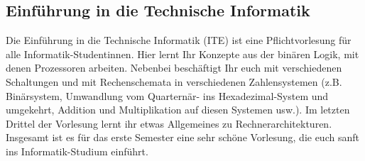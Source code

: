 \subsection{Einführung in die Technische Informatik}
\label{info2}
Die Einführung in die Technische Informatik (\gls{ITE}) ist eine Pflichtvorlesung für alle Informatik-Studentinnen. Hier lernt Ihr Konzepte aus der binären Logik, mit denen Prozessoren arbeiten. Nebenbei beschäftigt Ihr euch mit verschiedenen Schaltungen und mit Rechenschemata in verschiedenen Zahlensystemen (z.B. Binärsystem, Umwandlung vom Quarternär- ins Hexadezimal-System und umgekehrt, Addition und Multiplikation auf diesen Systemen usw.). Im letzten Drittel der Vorlesung lernt ihr etwas Allgemeines zu Rechnerarchitekturen. Insgesamt ist es für das erste Semester eine sehr schöne Vorlesung, die euch sanft ins Informatik-Studium einführt.
